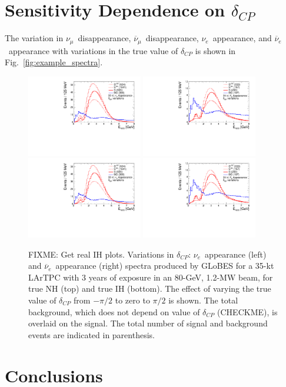 \documentclass[letterpaper,11pt]{article}
\begin{document}
\section{Sensitivity Dependence on $\delta_{CP}$}
\label{sect:deltacp}
The variation in $\nu_{\mu}$~disappearance, $\overline{\nu}_{\mu}$~disappearance, 
$\nu_e$~appearance, and $\overline{\nu}_e$~appearance with variations in the true
value of $\delta_{CP}$ is shown in Fig.~\ref{fig:example_spectra}.
\begin{figure}[!htb]
  \centering
  \includegraphics[width=0.45\textwidth]{figs/spectra_35kt_nue_dcpvar.pdf}
  \includegraphics[width=0.45\textwidth]{figs/spectra_35kt_nuebar_dcpvar.pdf}
  \includegraphics[width=0.45\textwidth]{figs/spectra_35kt_nue_dcpvar.pdf}
  \includegraphics[width=0.45\textwidth]{figs/spectra_35kt_nuebar_dcpvar.pdf}
  \caption{FIXME: Get real IH plots.
  Variations in $\delta_{CP}$:
  $\nu_e$~appearance (left) and $\overline{\nu}_e$~appearance (right) spectra 
  produced by GLoBES for a 35-kt LArTPC with 3 years of 
  exposure in an 80-GeV, 1.2-MW beam, for true NH (top) and true IH (bottom). 
  The effect of varying the true
  value of $\delta_{CP}$ from $-\pi/2$ to zero to $\pi/2$ is shown.
  The total background, which does not depend on value of $\delta_{CP}$ (CHECKME), 
  is overlaid on the signal. The total number
  of signal and background events are indicated in parenthesis.}
  \label{fig:dcpspec}
\end{figure}

\section{Conclusions}
\label{sect:conclude}



\end{document}
